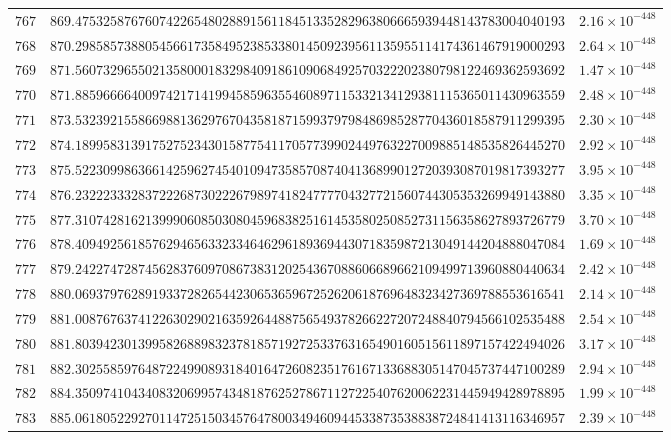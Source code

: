 \documentclass[12pt,reqno]{amsart}
\theoremstyle{remark}
\begin{document}
\begin{longtable}{clc}
$767$ & $869.4753258767607422654802889156118451335282963806665939448143783004040193$ & $2.16\times 10^{-448}$ \\
$768$ & $870.2985857388054566173584952385338014509239561135955114174361467919000293$ & $2.64\times 10^{-448}$ \\
$769$ & $871.5607329655021358000183298409186109068492570322202380798122469362593692$ & $1.47\times 10^{-448}$ \\
$770$ & $871.8859666640097421714199458596355460897115332134129381115365011430963559$ & $2.48\times 10^{-448}$ \\
$771$ & $873.5323921558669881362976704358187159937979848698528770436018587911299395$ & $2.30\times 10^{-448}$ \\
$772$ & $874.1899583139175275234301587754117057739902449763227009885148535826445270$ & $2.92\times 10^{-448}$ \\
$773$ & $875.5223099863661425962745401094735857087404136899012720393087019817393277$ & $3.95\times 10^{-448}$ \\
$774$ & $876.2322233328372226873022267989741824777704327721560744305353269949143880$ & $3.35\times 10^{-448}$ \\
$775$ & $877.3107428162139990608503080459683825161453580250852731156358627893726779$ & $3.70\times 10^{-448}$ \\
$776$ & $878.4094925618576294656332334646296189369443071835987213049144204888047084$ & $1.69\times 10^{-448}$ \\
$777$ & $879.2422747287456283760970867383120254367088606689662109499713960880440634$ & $2.42\times 10^{-448}$ \\
$778$ & $880.0693797628919337282654423065365967252620618769648323427369788553616541$ & $2.14\times 10^{-448}$ \\
$779$ & $881.0087676374122630290216359264488756549378266227207248840794566102535488$ & $2.54\times 10^{-448}$ \\
$780$ & $881.8039423013995826889832378185719272533763165490160515611897157422494026$ & $3.17\times 10^{-448}$ \\
$781$ & $882.3025585976487224990893184016472608235176167133688305147045737447100289$ & $2.94\times 10^{-448}$ \\
$782$ & $884.3509741043408320699574348187625278671127225407620062231445949428978895$ & $1.99\times 10^{-448}$ \\
$783$ & $885.0618052292701147251503457647800349460944533873538838724841413116346957$ & $2.39\times 10^{-448}$ \\

\end{longtable}
\end{document}

